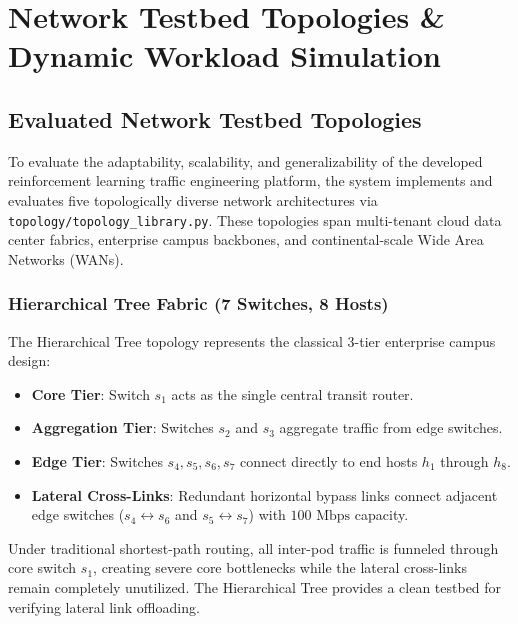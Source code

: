 \chapter{Network Testbed Topologies \& Dynamic Workload Simulation}
\label{chap:topologies}

\section{Evaluated Network Testbed Topologies}
To evaluate the adaptability, scalability, and generalizability of the developed reinforcement learning traffic engineering platform, the system implements and evaluates five topologically diverse network architectures via \texttt{topology/topology\_library.py}. These topologies span multi-tenant cloud data center fabrics, enterprise campus backbones, and continental-scale Wide Area Networks (WANs).

\subsection{Hierarchical Tree Fabric (7 Switches, 8 Hosts)}
The Hierarchical Tree topology represents the classical 3-tier enterprise campus design:
\begin{itemize}
    \item \textbf{Core Tier}: Switch $s_1$ acts as the single central transit router.
    \item \textbf{Aggregation Tier}: Switches $s_2$ and $s_3$ aggregate traffic from edge switches.
    \item \textbf{Edge Tier}: Switches $s_4, s_5, s_6, s_7$ connect directly to end hosts $h_1$ through $h_8$.
    \item \textbf{Lateral Cross-Links}: Redundant horizontal bypass links connect adjacent edge switches ($s_4 \leftrightarrow s_6$ and $s_5 \leftrightarrow s_7$) with $100\text{ Mbps}$ capacity.
\end{itemize}
Under traditional shortest-path routing, all inter-pod traffic is funneled through core switch $s_1$, creating severe core bottlenecks while the lateral cross-links remain completely unutilized. The Hierarchical Tree provides a clean testbed for verifying lateral link offloading.

